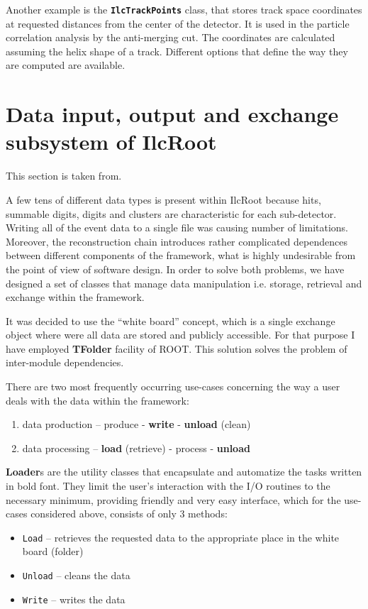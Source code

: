 \documentclass[12pt,a4paper,twoside]{article}
\newcommand{\class}[1]{\texttt{\textbf{#1}}\xspace}
\begin{document}
{Another example is the \class{IlcTrackPoints} class, that stores 
track space coordinates at requested distances from the center of 
the detector. It is used in the particle correlation analysis
by the anti-merging cut.
The coordinates are calculated assuming the helix shape
of a track. Different options that define the way they are computed
are available. 




\newpage
\section{Data input, output and exchange subsystem of IlcRoot}

This section is taken from\cite{PiotrPhD}.

A few tens of different data types is present within IlcRoot  because 
hits, summable digits, digits and clusters are characteristic for each
sub-detector. Writing all of the event data to a single file was
causing number of limitations.  
Moreover, the reconstruction chain introduces rather complicated dependences 
between different components of the framework, what is highly 
undesirable from the point of view  of software design.
In order to solve both problems, we have designed a set of classes that 
manage data manipulation i.e. storage, retrieval and exchange within 
the framework. 

It was decided to use the ``white board'' concept, which is a single
exchange object where were all data are stored and  publicly accessible.
For that purpose I have employed \textbf{TFolder} facility of ROOT.
This solution solves the problem of inter-module dependencies.

There are two most frequently occurring use-cases concerning the way a user deals with the data within the framework:
\begin{enumerate}
\item data production -- produce - \textbf{write} - \textbf{unload} (clean)
\item data processing -- \textbf{load} (retrieve) - process - \textbf{unload}
\end{enumerate}
% 
\textbf{Loader}s are the utility classes that encapsulate and 
automatize the tasks written in  bold font.
They limit the user's interaction with the I/O routines to the
necessary minimum, providing  friendly and very easy interface,
which for the use-cases considered above, consists of only 3 methods:
\begin{itemize}
\item \texttt{Load} --  retrieves the requested data to the appropriate place in the 
  white board (folder)
\item \texttt{Unload} -- cleans the data
\item \texttt{Write} -- writes the data
\end{itemize}

}
\end{document}
